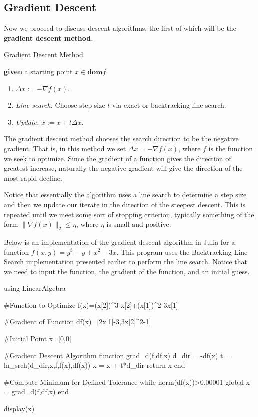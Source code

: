 \documentclass[11pt]{article}
\begin{document}
\subsection{Gradient Descent}
Now we proceed to discuss descent algorithms, the first of which will be the {\color{tiananmen}\textbf{gradient descent method}}.
\begin{algorithm}[H]
	\caption{Gradient Descent Method \cite{Boyd2004}\label{GradientDescentAlg}}
	\begin{algorithmic} 
		\State \textbf{given} a starting point $x\in\textbf{dom}f$.
		\Repeat
		\begin{enumerate}
			\item $\Delta x:=-\nabla f(x)$.
			\item \textit{Line search.} Choose step size $t$ via exact or backtracking line search.
			\item \textit{Update.} $x:=x+t\Delta x$.
		\end{enumerate}
	\end{algorithmic}
\end{algorithm}
The gradient descent method chooses the search direction to be the negative gradient. That is, in this method we set $\Delta x=-\nabla f(x)$, where $f$ is the function we seek to optimize. Since the gradient of a function gives the direction of greatest increase, naturally the negative gradient will give the direction of the most rapid decline.

Notice that essentially the algorithm uses a line search to determine a step size and then we update our iterate in the direction of the steepest descent. This is repeated until we meet some sort of stopping criterion, typically something of the form $\|\nabla f(x)\|_2\leq\eta$, where $\eta$ is small and positive.

Below is an implementation of the gradient descent algorithm in Julia for a function $f(x,y)=y^3-y+x^2-3x$. This program uses the Backtracking Line Search implementation presented earlier to perform the line search. Notice that we need to input the function, the gradient of the function, and an initial guess.
\begin{jllisting}
	using LinearAlgebra
	
	#Function to Optimize
	f(x)=(x[2])^3-x[2]+(x[1])^2-3x[1]
	
	#Gradient of Function
	df(x)=[2x[1]-3,3x[2]^2-1]
	
	#Initial Point
	x=[0,0]
	
	#Gradient Descent Algorithm
	function grad_d(f,df,x)
		d_dir = -df(x)
		t = ln_srch(d_dir,x,f,f(x),df(x))
		x = x + t*d_dir
		return x
	end
	
	#Compute Minimum for Defined Tolerance
	while norm(df(x))>0.00001
		global x = grad_d(f,df,x)
	end
	
	display(x)
	
\end{jllisting}
\end{document}
